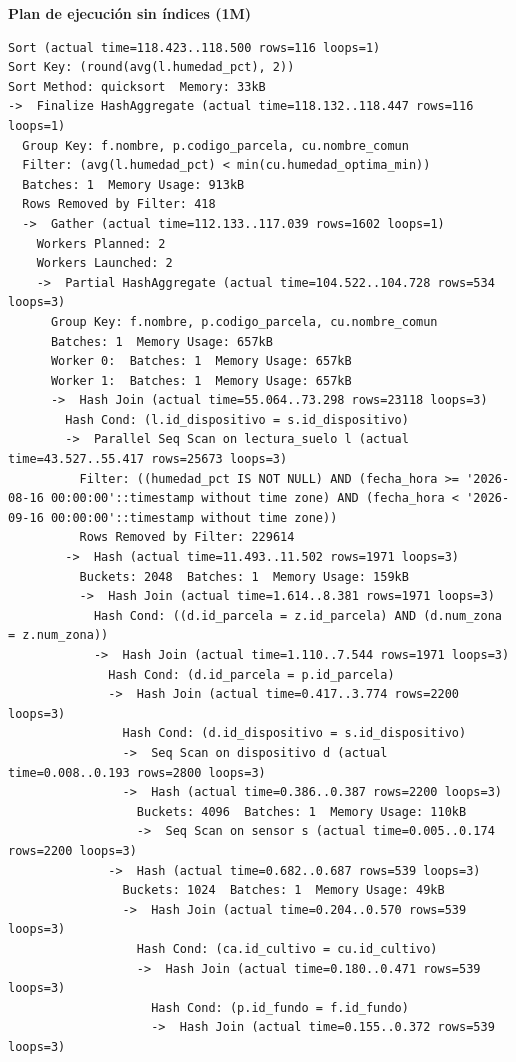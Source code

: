 \documentclass[11pt,letterpaper]{article}
\begin{document}
\textbf{Plan de ejecución sin índices (1M)}
\begin{lstlisting}[style=plano]
Sort (actual time=118.423..118.500 rows=116 loops=1)
Sort Key: (round(avg(l.humedad_pct), 2))
Sort Method: quicksort  Memory: 33kB
->  Finalize HashAggregate (actual time=118.132..118.447 rows=116 loops=1)
  Group Key: f.nombre, p.codigo_parcela, cu.nombre_comun
  Filter: (avg(l.humedad_pct) < min(cu.humedad_optima_min))
  Batches: 1  Memory Usage: 913kB
  Rows Removed by Filter: 418
  ->  Gather (actual time=112.133..117.039 rows=1602 loops=1)
    Workers Planned: 2
    Workers Launched: 2
    ->  Partial HashAggregate (actual time=104.522..104.728 rows=534 loops=3)
      Group Key: f.nombre, p.codigo_parcela, cu.nombre_comun
      Batches: 1  Memory Usage: 657kB
      Worker 0:  Batches: 1  Memory Usage: 657kB
      Worker 1:  Batches: 1  Memory Usage: 657kB
      ->  Hash Join (actual time=55.064..73.298 rows=23118 loops=3)
        Hash Cond: (l.id_dispositivo = s.id_dispositivo)
        ->  Parallel Seq Scan on lectura_suelo l (actual time=43.527..55.417 rows=25673 loops=3)
          Filter: ((humedad_pct IS NOT NULL) AND (fecha_hora >= '2026-08-16 00:00:00'::timestamp without time zone) AND (fecha_hora < '2026-09-16 00:00:00'::timestamp without time zone))
          Rows Removed by Filter: 229614
        ->  Hash (actual time=11.493..11.502 rows=1971 loops=3)
          Buckets: 2048  Batches: 1  Memory Usage: 159kB
          ->  Hash Join (actual time=1.614..8.381 rows=1971 loops=3)
            Hash Cond: ((d.id_parcela = z.id_parcela) AND (d.num_zona = z.num_zona))
            ->  Hash Join (actual time=1.110..7.544 rows=1971 loops=3)
              Hash Cond: (d.id_parcela = p.id_parcela)
              ->  Hash Join (actual time=0.417..3.774 rows=2200 loops=3)
                Hash Cond: (d.id_dispositivo = s.id_dispositivo)
                ->  Seq Scan on dispositivo d (actual time=0.008..0.193 rows=2800 loops=3)
                ->  Hash (actual time=0.386..0.387 rows=2200 loops=3)
                  Buckets: 4096  Batches: 1  Memory Usage: 110kB
                  ->  Seq Scan on sensor s (actual time=0.005..0.174 rows=2200 loops=3)
              ->  Hash (actual time=0.682..0.687 rows=539 loops=3)
                Buckets: 1024  Batches: 1  Memory Usage: 49kB
                ->  Hash Join (actual time=0.204..0.570 rows=539 loops=3)
                  Hash Cond: (ca.id_cultivo = cu.id_cultivo)
                  ->  Hash Join (actual time=0.180..0.471 rows=539 loops=3)
                    Hash Cond: (p.id_fundo = f.id_fundo)
                    ->  Hash Join (actual time=0.155..0.372 rows=539 loops=3)

\end{lstlisting}
\end{document}
